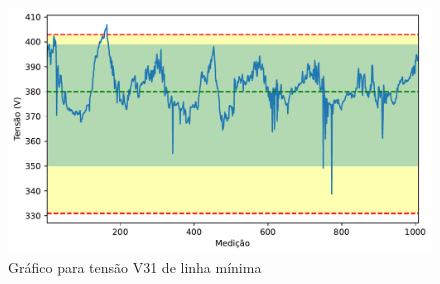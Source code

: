\begin{figure}[H]
	\centering
	\caption{Gráfico para tensão V31 de linha mínima}
    \includegraphics[width=16cm]{illustrations/figures/a1_V31_Min.pdf}
\end{figure}

